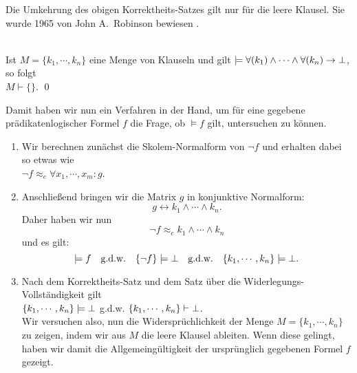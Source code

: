 \noindent
Die Umkehrung des obigen Korrektheits-Satzes gilt nur für die leere Klausel.  Sie wurde 1965 von John
A.~Robinson bewiesen \cite{robinson:1965}.
\begin{Satz} \hspace*{\fill} \\
  Ist $M = \{k_1,\cdots,k_n\}$ eine Menge von Klauseln und gilt 
  $\models \forall(k_1) \wedge \cdots \wedge \forall(k_n) \rightarrow \bot$, so folgt \\[0.2cm]
  \hspace*{1.3cm} $M \vdash \{\}$.
    \qed
\end{Satz}
\noindent
Damit haben wir nun ein Verfahren in der Hand, um für eine gegebene 
prädikatenlogischer Formel $f$ die Frage, ob $\models f$ gilt, untersuchen zu können.
\begin{enumerate}
\item Wir berechnen zunächst die Skolem-Normalform von $\neg f$ und erhalten dabei so etwas wie \\[0.2cm]
      \hspace*{1.3cm} $\neg f \approx_e \forall x_1, \cdots, x_m \colon g$.
\item Anschließend bringen wir die Matrix $g$ in konjunktive Normalform: 
      \[ g \leftrightarrow k_1 \wedge \cdots \wedge k_n. \]
      Daher haben wir nun 
      \[ \neg f \approx_e k_1 \wedge \cdots \wedge k_n \] 
      und es gilt: 
      \[  
          \models f                           \quad \mbox{g.d.w.} \quad
          \{\neg f\} \models \bot          \quad \mbox{g.d.w.} \quad 
          \{k_1,\cdots,k_n\} \models \bot.
      \]
\item Nach dem Korrektheits-Satz und dem Satz über die Widerlegungs-Vollständigkeit gilt
      \\[0.2cm]
      \hspace*{1.3cm} 
      $\{k_1,\cdots,k_n\} \models \bot$ \quad g.d.w. \quad 
      $\{k_1,\cdots,k_n\} \vdash \bot$. \\[0.2cm]
      Wir versuchen also, nun die Widersprüchlichkeit der Menge $M = \{ k_1, \cdots, k_n \}$  zu zeigen, indem wir
      aus $M$ die leere Klausel ableiten.
      Wenn diese gelingt, haben wir damit die Allgemeingültigkeit der ursprünglich
      gegebenen Formel $f$ gezeigt.
\end{enumerate}

